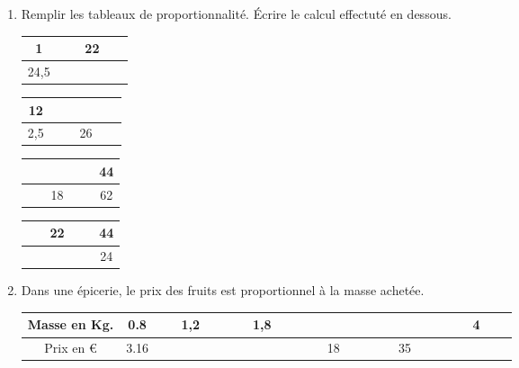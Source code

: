 \documentclass[12pt]{article}
\begin{document}
\begin{enumerate}
\item Remplir les tableaux de proportionnalité. Écrire le calcul effectuté en dessous.

  \begin{multicols}{4}\noindent
    \begin{center}
      \begin{tabular}{|c|c|}
        \hline
        1 & 22\\  \hline
        24,5 & $\phantom{azertyuiop}$\\  \hline
      \end{tabular}
    \end{center}
    \Pointilles[1]
    \begin{center}
      \begin{tabular}{|c|c|}
        \hline
        12 & $\phantom{azertyuiop}$\\  \hline
        2,5 & 26\\  \hline
      \end{tabular}
    \end{center}
    \Pointilles[1]
    \begin{center}
      \begin{tabular}{|c|c|}
        \hline
        $\phantom{azertyuiop}$  & 44\\  \hline
        18 & 62\\  \hline
      \end{tabular}
    \end{center}
    \Pointilles[1]
    \begin{center}
      \begin{tabular}{|c|c|}
        \hline
        22 & 44\\  \hline
        $\phantom{azertyuiop}$ & 24\\  \hline
      \end{tabular}
    \end{center}
    \Pointilles[1]
  \end{multicols}

\item Dans une épicerie, le prix des fruits est proportionnel à la masse achetée. 

  \begin{center}
    \begin{tabular}{|c|c|c|c|c|c|c|}
      \hline
      Masse en Kg.&  0.8 & 1,2 & 1,8 & $\phantom{azertyuiop}$   & $\phantom{azertyuiop}$   & 4 \\  \hline
      Prix en \euro & 3.16 & $\phantom{azertyuiop}$    & $\phantom{azertyuiop}$    & 18 & 35 & $\phantom{azertyuiop}$   \\  \hline
    \end{tabular}
  \end{center}


\end{enumerate}
\end{document}
